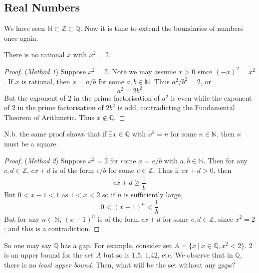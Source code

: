 \documentclass[10pt, a4paper, twoside]{report}
\begin{document}
\subsection{Real Numbers}
We have seen \(\mathbb{N}\subset\mathbb{Z}\subset\mathbb{Q}\). Now it is time to extend the boundaries of numbers once again.
\begin{proposition}
    There is no rational \(x\) with \(x^2=2\).
\end{proposition}
\begin{proof} (\emph{Method 1}) 
    Suppose \(x^2=2\). Note we may assume \(x>0\) since \((-x)^2=x^2\). If \(x\) is rational, then \(x=a/b\) for some \(a,b\in\mathbb{N}\). Thus \(a^2/b^2=2\), or \[a^2=2b^2\]
    But the exponent of \(2\) in the prime factorisation of \(a^2\) is even while the exponent of \(2\) in the prime factorisation of \(2b^2\) is odd, contradicting the Fundamental Theorem of Arithmetic. Thus \(x\notin\mathbb{Q}\).
\end{proof}
N.b. the same proof shows that if \(\exists x\in\mathbb{Q}\) with \(x^2=n\) for some \(n\in\mathbb{N}\), then \(n\) must be a square.
\begin{proof}
    (\emph{Method 2}) Suppose \(x^2=2\) for some \(x=a/b\) with \(a,b\in\mathbb{N}\). Then for any \(c,d\in\mathbb{Z}\), \(cx+d\) is of the form \(e/b\) for some \(e\in\mathbb{Z}\). Thus if \(cx+d>0\), then 
    \[cx+d\geq\frac 1b\]
    But \(0<x-1<1\) as \(1<x<2\) so if \(n\) is sufficiently large, 
    \[0<(x-1)^n<\frac 1b\] 
    But for any \(n\in\mathbb{N}\), \((x-1)^n\) is of the form \(cx+d\) for some \(c,d\in\mathbb{Z}\), since \(x^2=2\); and this is a contradiction.
\end{proof}
So one may say \(\mathbb{Q}\) has a gap. For example, consider set \(A=\{x\:|\:x\in\mathbb{Q},x^2<2\}\). \(2\) is an upper bound for the set \(A\) but so is \(1.5\), \(1.42\), etc. We observe that in \(\mathbb{Q}\), there is no \emph{least upper bound}. Then, what will be the set without any gaps? 
\end{document}
